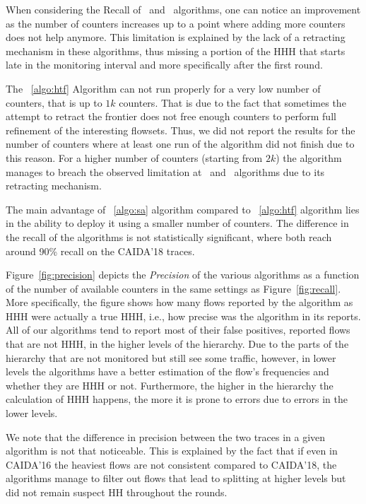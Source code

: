 When considering the Recall of ~\simpleAlgo and ~\multipleAlgo algorithms, one can notice an improvement as the number of counters increases up to a point where adding more counters does not help anymore. This limitation is explained by the lack of a retracting mechanism in these algorithms, thus missing a portion of the HHH that starts late in the monitoring interval and more specifically after the first round.

The ~\ref{algo:htf} Algorithm can not run properly for a very low number of counters, that is up to $1k$ counters. That is due to the fact that sometimes the attempt to retract the frontier does not free enough counters to perform full refinement of the interesting flowsets. Thus, we did not report the results for the number of counters where at least one run of the algorithm did not finish due to this reason. For a higher number of counters (starting from $2k$) the algorithm manages to breach the observed limitation at ~\simpleAlgo and ~\multipleAlgo algorithms due to its retracting mechanism.

The main advantage of ~\ref{algo:sa} algorithm compared to ~\ref{algo:htf} algorithm lies in the ability to deploy it using a smaller number of counters. The difference in the recall of the algorithms is not statistically significant, where both reach around 90\% recall on the CAIDA'18 traces.



Figure~\ref{fig:precision} depicts the \textit{Precision} of the various algorithms as a function of the number of available counters in the same settings as Figure~\ref{fig:recall}. More specifically, the figure shows how many flows reported by the algorithm as HHH were actually a true HHH, i.e., how precise was the algorithm in its reports. All of our algorithms tend to report most of their false positives, reported flows that are not HHH, in the higher levels of the hierarchy. Due to the parts of the hierarchy that are not monitored but still see some traffic, however, in lower levels the algorithms have a better estimation of the flow's frequencies and whether they are HHH or not. Furthermore, the higher in the hierarchy the calculation of HHH happens, the more it is prone to errors due to errors in the lower levels.

We note that the difference in precision between the two traces in a given algorithm is not that noticeable. This is explained by the fact that if even in CAIDA'16 the heaviest flows are not consistent compared to CAIDA'18, the algorithms manage to filter out flows that lead to splitting at higher levels but did not remain suspect HH throughout the rounds.

